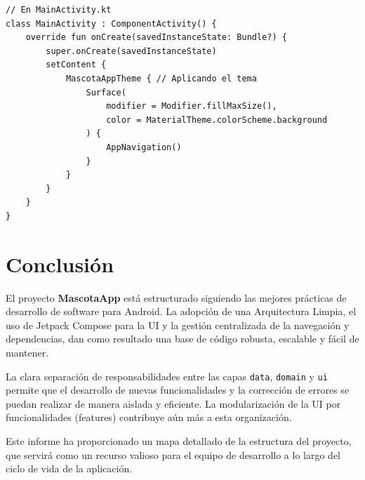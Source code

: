 \documentclass[12pt, a4paper]{article}
\begin{document}
\begin{lstlisting}[caption={Uso del Tema en la Aplicación}, label={lst:theme}]
// En MainActivity.kt
class MainActivity : ComponentActivity() {
    override fun onCreate(savedInstanceState: Bundle?) {
        super.onCreate(savedInstanceState)
        setContent {
            MascotaAppTheme { // Aplicando el tema
                Surface(
                    modifier = Modifier.fillMaxSize(),
                    color = MaterialTheme.colorScheme.background
                ) {
                    AppNavigation()
                }
            }
        }
    }
}
\end{lstlisting}

\newpage

\section{Conclusión}
El proyecto \textbf{MascotaApp} está estructurado siguiendo las mejores prácticas de desarrollo de software para Android. La adopción de una Arquitectura Limpia, el uso de Jetpack Compose para la UI y la gestión centralizada de la navegación y dependencias, dan como resultado una base de código robusta, escalable y fácil de mantener.

La clara separación de responsabilidades entre las capas \texttt{data}, \texttt{domain} y \texttt{ui} permite que el desarrollo de nuevas funcionalidades y la corrección de errores se puedan realizar de manera aislada y eficiente. La modularización de la UI por funcionalidades (features) contribuye aún más a esta organización.

Este informe ha proporcionado un mapa detallado de la estructura del proyecto, que servirá como un recurso valioso para el equipo de desarrollo a lo largo del ciclo de vida de la aplicación.
\end{document}
